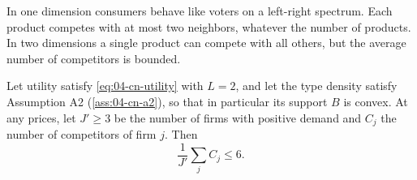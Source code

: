 In one dimension consumers behave like voters on a left-right spectrum. Each product competes with at most two
neighbors, whatever the number of products. In two dimensions a single product can compete with all others, but
the average number of competitors is bounded.

\begin{proposition}\label{prop:04-cn-six}
Let utility satisfy \eqref{eq:04-cn-utility} with $L = 2$, and let the type density satisfy Assumption A2
(\cref{ass:04-cn-a2}), so that in particular its support $B$ is convex. At any prices, let $J' \geq 3$ be the
number of firms with positive demand and $C_j$ the number of competitors of firm $j$. Then
\begin{equation*}
\frac{1}{J'}\sum_{j}C_j \leq 6 .
\end{equation*}
\end{proposition}

